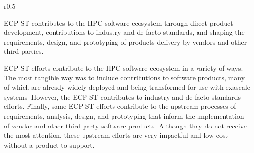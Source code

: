 \begin{wrapfigure}{r}{0.5\textwidth}
	\begin{mdframed}
		\large{ECP ST contributes to the HPC software ecosystem through direct product development, contributions to industry and de facto standards, and shaping the requirements, design, and prototyping of products delivery by vendors and other third parties.}
	\end{mdframed}
\end{wrapfigure}
ECP ST efforts contribute to the HPC software ecosystem in a variety of ways. The most tangible way was to include contributions to software products, many of which are already widely deployed and being transformed for use with exascale systems.  However, the ECP ST contributes to industry and de facto standards efforts.  Finally, some ECP ST efforts contribute to the upstream processes of requirements, analysis, design, and prototyping that inform the implementation of vendor and other third-party software products.  Although they do not receive the most attention, these upstream efforts are very impactful and low cost without a product to support.

%
